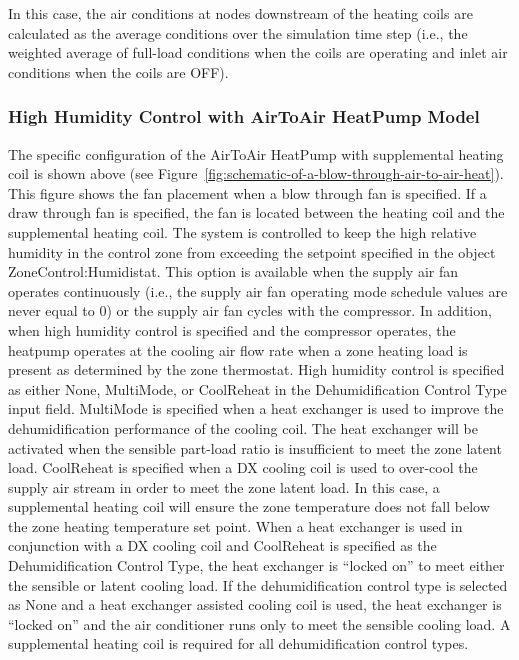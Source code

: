 In this case, the air conditions at nodes downstream of the heating coils are calculated as the average conditions over the simulation time step (i.e., the weighted average of full-load conditions when the coils are operating and inlet air conditions when the coils are OFF).

\subsubsection{High Humidity Control with AirToAir HeatPump Model}\label{high-humidity-control-with-airtoair-heatpump-model}

The specific configuration of the AirToAir HeatPump with supplemental heating coil is shown above (see Figure~\ref{fig:schematic-of-a-blow-through-air-to-air-heat}). This figure shows the fan placement when a blow through fan is specified. If a draw through fan is specified, the fan is located between the heating coil and the supplemental heating coil. The system is controlled to keep the high relative humidity in the control zone from exceeding the setpoint specified in the object ZoneControl:Humidistat. This option is available when the supply air fan operates continuously (i.e., the supply air fan operating mode schedule values are never equal to 0) or the supply air fan cycles with the compressor. In addition, when high humidity control is specified and the compressor operates, the heatpump operates at the cooling air flow rate when a zone heating load is present as determined by the zone thermostat. High humidity control is specified as either None, MultiMode, or CoolReheat in the Dehumidification Control Type input field. MultiMode is specified when a heat exchanger is used to improve the dehumidification performance of the cooling coil. The heat exchanger will be activated when the sensible part-load ratio is insufficient to meet the zone latent load. CoolReheat is specified when a DX cooling coil is used to over-cool the supply air stream in order to meet the zone latent load. In this case, a supplemental heating coil will ensure the zone temperature does not fall below the zone heating temperature set point. When a heat exchanger is used in conjunction with a DX cooling coil and CoolReheat is specified as the Dehumidification Control Type, the heat exchanger is ``locked on'' to meet either the sensible or latent cooling load. If the dehumidification control type is selected as None and a heat exchanger assisted cooling coil is used, the heat exchanger is ``locked on'' and the air conditioner runs only to meet the sensible cooling load. A supplemental heating coil is required for all dehumidification control types.

